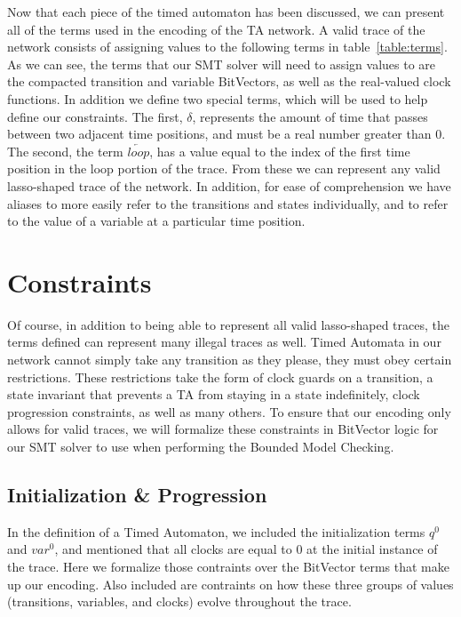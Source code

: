 \documentclass[a4paper,12pt]{article}
\newcommand*\BitAnd{\mathbin{\&}}
\newcommand*\BitOr{\mathbin{|}}
\begin{document}
Now that each piece of the timed automaton has been discussed, we can present
all of the terms used in the encoding of the TA network. A valid trace of the
network consists of assigning values to the following terms in table\
\ref{table:terms}. As we can see, the terms that our SMT solver will need
to assign values to are the compacted transition and variable BitVectors, as
well as the real-valued clock functions. In addition we define two special
terms, which will be used to help define our constraints. The first, \(\delta\),
represents the amount of time that passes between two adjacent time positions,
and must be a real number greater than 0. The second, the term
\(\overleftarrow{loop}\), has a value equal to the index of the first time
position in the loop portion of the trace. From these we can represent any valid
lasso-shaped trace of the network. In addition, for ease of comprehension we
have aliases to more easily refer to the transitions and states individually,
and to refer to the value of a variable at a particular time position.


\section{Constraints}\label{constraints}

Of course, in addition to being able to represent all valid lasso-shaped traces,
the terms defined can represent many illegal traces as well. Timed Automata in
our network cannot simply take any transition as they please, they must obey
certain restrictions. These restrictions take the form of clock guards on a
transition, a state invariant that prevents a TA from staying in a state
indefinitely, clock progression constraints, as well as many others. To ensure
that our encoding only allows for valid traces, we will formalize these
constraints in BitVector logic for our SMT solver to use when performing the
Bounded Model Checking.

\subsection{Initialization \& Progression}\label{constraints-init}

In the definition of a Timed Automaton, we included the initialization terms
\(q^{0}\) and \(var^{0}\), and mentioned that all clocks are equal to 0 at the
initial instance of the trace. Here we formalize those contraints over the
BitVector terms that make up our encoding. Also included are contraints on how
these three groups of values (transitions, variables, and clocks) evolve
throughout the trace.
\end{document}
